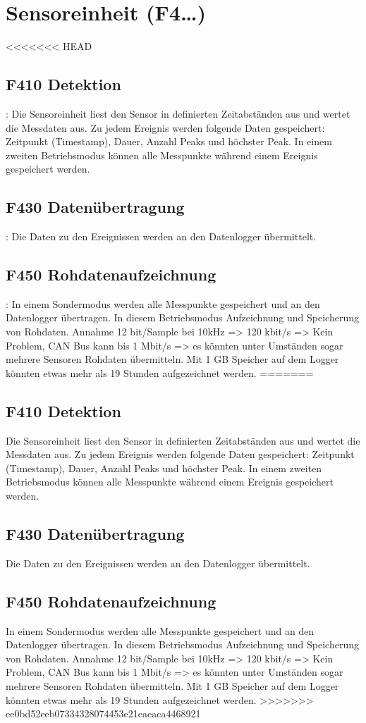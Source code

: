 \section{Sensoreinheit (F4\ldots)}
<<<<<<< HEAD
\subsection{F410 Detektion}: Die Sensoreinheit liest den Sensor in definierten Zeitabständen aus und wertet die Messdaten aus. Zu jedem Ereignis werden folgende Daten gespeichert: Zeitpunkt (Timestamp), Dauer, Anzahl Peaks und höchster Peak. In einem zweiten Betriebsmodus können alle Messpunkte während einem Ereignis gespeichert werden.

\subsection{F430 Datenübertragung}: Die Daten zu den Ereignissen werden an den Datenlogger übermittelt.

\subsection{F450 Rohdatenaufzeichnung}: In einem Sondermodus werden alle Messpunkte gespeichert und an den Datenlogger übertragen. In diesem Betriebsmodus  Aufzeichnung und Speicherung von Rohdaten. Annahme 12 bit/Sample bei 10kHz => 120 kbit/s => Kein Problem, CAN Bus kann bis 1 Mbit/s => es könnten unter Umständen sogar mehrere Sensoren Rohdaten übermitteln. Mit 1 GB Speicher auf dem Logger könnten etwas mehr als 19 Stunden aufgezeichnet werden.
=======
\subsection{F410 Detektion}
Die Sensoreinheit liest den Sensor in definierten Zeitabständen aus und wertet die Messdaten aus. Zu jedem Ereignis werden folgende Daten gespeichert: Zeitpunkt (Timestamp), Dauer, Anzahl Peaks und höchster Peak. In einem zweiten Betriebsmodus können alle Messpunkte während einem Ereignis gespeichert werden.

\subsection{F430 Datenübertragung}
Die Daten zu den Ereignissen werden an den Datenlogger übermittelt.

\subsection{F450 Rohdatenaufzeichnung}
In einem Sondermodus werden alle Messpunkte gespeichert und an den Datenlogger übertragen. In diesem Betriebsmodus  Aufzeichnung und Speicherung von Rohdaten. Annahme 12 bit/Sample bei 10kHz => 120 kbit/s => Kein Problem, CAN Bus kann bis 1 Mbit/s => es könnten unter Umständen sogar mehrere Sensoren Rohdaten übermitteln. Mit 1 GB Speicher auf dem Logger könnten etwas mehr als 19 Stunden aufgezeichnet werden.
>>>>>>> ee0bd52eeb07334328074453e21eaeaca4468921

